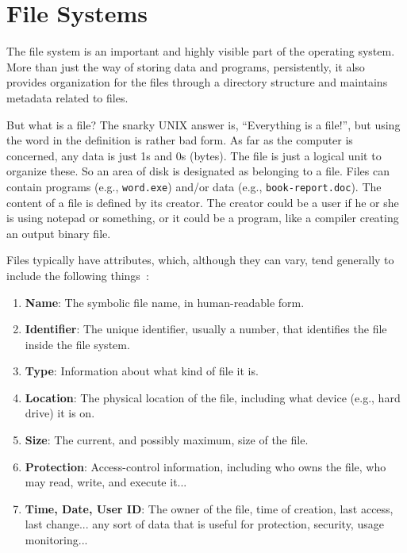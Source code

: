 




\section*{File Systems}

The file system is an important and highly visible part of the operating system. More than just the way of storing data and programs, persistently, it also provides organization for the files through a directory structure and maintains metadata related to files. 

But what is a file? The snarky UNIX answer is, ``Everything is a file!'', but using the word in the definition is rather bad form. As far as the computer is concerned, any data is just 1s and 0s (bytes). The file is just a logical unit to organize these. So an area of disk is designated as belonging to a file. Files can contain programs (e.g., \texttt{word.exe}) and/or data (e.g., \texttt{book-report.doc}). The content of a file is defined by its creator. The creator could be a user if he or she is using notepad or something, or it could be a program, like a compiler creating an output binary file.

Files typically have attributes, which, although they can vary, tend generally to include the following things~\cite{osc}:

\begin{enumerate}
	\item \textbf{Name}: The symbolic file name, in human-readable form.
	\item \textbf{Identifier}: The unique identifier, usually a number, that identifies the file inside the file system.
	\item \textbf{Type}: Information about what kind of file it is.
	\item \textbf{Location}: The physical location of the file, including what device (e.g., hard drive) it is on.
	\item \textbf{Size}: The current, and possibly maximum, size of the file.
	\item \textbf{Protection}: Access-control information, including who owns the file, who may read, write, and execute it...
	\item \textbf{Time, Date, User ID}: The owner of the file, time of creation, last access, last change... any sort of data that is useful for protection, security, usage monitoring...
\end{enumerate}

